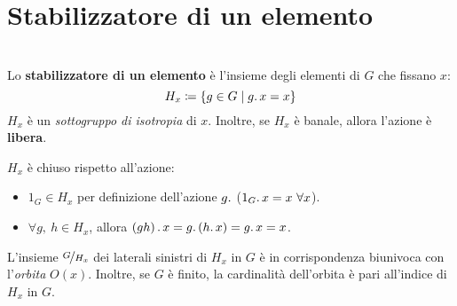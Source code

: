 \section{Stabilizzatore di un elemento}
\begin{define}~{}\\
Lo \textbf{stabilizzatore di un elemento} è l'insieme degli elementi di $G$ che fissano $x$:
\begin{equation}
H_x\coloneqq \left\{g\in G\mid g\ldotp x = x\right\}
\end{equation}
$H_x$ è un \textit{sottogruppo di isotropia} di $x$. Inoltre, se $H_x$ è banale, allora l'azione è \textbf{libera}.
\end{define}
\begin{demonstration} $H_x$ è chiuso rispetto all'azione:
	\begin{itemize}
		\item $1_G\in H_x$ per definizione dell'azione $g\ldotp$ ($1_G\ldotp x=x\ \forall x$).
		\item $\forall g,\ h\in H_x$, allora $\left(gh\right)\ldotp x=g\ldotp \left(h\ldotp x\right)=g\ldotp x=x$.
	\end{itemize}
\vspace{-3mm}
\end{demonstration}
\begin{observe}
L'insieme $\nicefrac{G}{H_x}$ dei laterali sinistri di $H_x$ in $G$ è in corrispondenza biunivoca con l'\textit{orbita} $O\left(x\right)$. Inoltre, se $G$ è finito, la cardinalità dell'orbita è pari all'indice di $H_x$ in $G$.
\end{observe}
